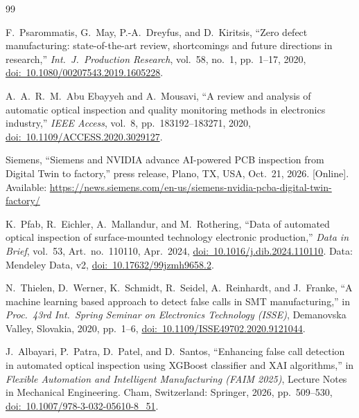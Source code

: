 \documentclass[11pt,a4paper]{article}
\begin{document}
\begin{thebibliography}{99}
\small

F.~Psarommatis, G.~May, P.-A.~Dreyfus, and D.~Kiritsis, ``Zero defect manufacturing: state-of-the-art review, shortcomings and future directions in research,'' \textit{Int.\ J.\ Production Research}, vol.~58, no.~1, pp.~1--17, 2020, \href{https://doi.org/10.1080/00207543.2019.1605228}{doi:~10.1080/00207543.2019.1605228}.

A.~A.~R.~M.~Abu Ebayyeh and A.~Mousavi, ``A review and analysis of automatic optical inspection and quality monitoring methods in electronics industry,'' \textit{IEEE Access}, vol.~8, pp.~183192--183271, 2020, \href{https://doi.org/10.1109/ACCESS.2020.3029127}{doi:~10.1109/ACCESS.2020.3029127}.

Siemens, ``Siemens and NVIDIA advance AI-powered PCB inspection from Digital Twin to factory,'' press release, Plano, TX, USA, Oct.~21, 2026. [Online]. Available: \url{https://news.siemens.com/en-us/siemens-nvidia-pcba-digital-twin-factory/}

K.~Pfab, R.~Eichler, A.~Mallandur, and M.~Rothering, ``Data of automated optical inspection of surface-mounted technology electronic production,'' \textit{Data in Brief}, vol.~53, Art.~no.~110110, Apr.~2024, \href{https://doi.org/10.1016/j.dib.2024.110110}{doi:~10.1016/j.dib.2024.110110}. Data: Mendeley Data, v2, \href{https://doi.org/10.17632/99jzmh9658.2}{doi:~10.17632/99jzmh9658.2}.

N.~Thielen, D.~Werner, K.~Schmidt, R.~Seidel, A.~Reinhardt, and J.~Franke, ``A machine learning based approach to detect false calls in SMT manufacturing,'' in \textit{Proc.\ 43rd Int.\ Spring Seminar on Electronics Technology (ISSE)}, Demanovska Valley, Slovakia, 2020, pp.~1--6, \href{https://doi.org/10.1109/ISSE49702.2020.9121044}{doi:~10.1109/ISSE49702.2020.9121044}.

J.~Albayari, P.~Patra, D.~Patel, and D.~Santos, ``Enhancing false call detection in automated optical inspection using XGBoost classifier and XAI algorithms,'' in \textit{Flexible Automation and Intelligent Manufacturing (FAIM 2025)}, Lecture Notes in Mechanical Engineering. Cham, Switzerland: Springer, 2026, pp.~509--530, \href{https://doi.org/10.1007/978-3-032-05610-8_51}{doi:~10.1007/978-3-032-05610-8\_51}.


\end{thebibliography}
\end{document}
